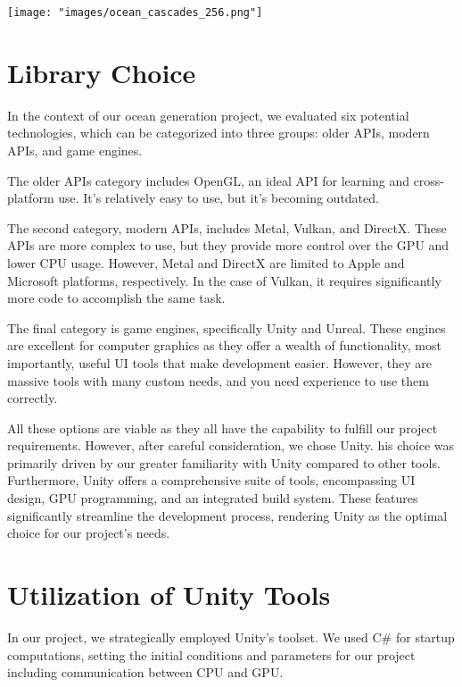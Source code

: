 \begin{minipage}{1\textwidth}
    \centering
    \texttt{[image: "images/ocean\_cascades\_256.png"]}
    \label{fig:ocean_with_cascades_256}
\end{minipage}

\section{Library Choice}

In the context of our ocean generation project, we evaluated six potential technologies, which can be categorized into three groups: older APIs, modern APIs, and game engines.

The older APIs category includes OpenGL, an ideal API for learning and cross-platform use. It’s relatively easy to use, but it’s becoming outdated.

The second category, modern APIs, includes Metal, Vulkan, and DirectX. These APIs are more complex to use, but they provide more control over the GPU and lower CPU usage. However, Metal and DirectX are limited to Apple and Microsoft platforms, respectively. In the case of Vulkan, it requires significantly more code to accomplish the same task.

The final category is game engines, specifically Unity and Unreal. These engines are excellent for computer graphics as they offer a wealth of functionality, most importantly, useful UI tools that make development easier. However, they are massive tools with many custom needs, and you need experience to use them correctly.

All these options are viable as they all have the capability to fulfill our project requirements. However, after careful consideration, we chose Unity. his choice was primarily driven by our greater familiarity with Unity compared to other tools. Furthermore, Unity offers a comprehensive suite of tools, encompassing UI design, GPU programming, and an integrated build system. These features significantly streamline the development process, rendering Unity as the optimal choice for our project's needs.

\section{Utilization of Unity Tools}
In our project, we strategically employed Unity’s toolset. We used C\# for startup computations, setting the initial conditions and parameters for our project including communication between CPU and GPU.

